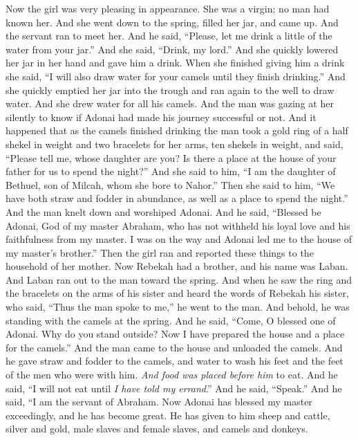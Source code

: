 \begin{biblechapter}
\verse Now the girl was very pleasing in appearance. She was a virgin; no man had known her. And she went down to the spring, filled her jar, and came up.
\verse And the servant ran to meet her. And he said, “Please, let me drink a little of the water from your jar.”
\verse And she said, “Drink, my lord.” And she quickly lowered her jar in her hand and gave him a drink.
\verse When she finished giving him a drink she said, “I will also draw water for your camels until they finish drinking.”
\verse And she quickly emptied her jar into the trough and ran again to the well to draw water. And she drew water for all his camels.
\verse And the man was gazing at her silently to know if Adonai had made his journey successful or not.
\verse And it happened that as the camels finished drinking the man took a gold ring of a half shekel in weight and two bracelets for her arms, ten shekels in weight,
\verse and said, “Please tell me, whose daughter are you? Is there a place at the house of your father for us to spend the night?”
\verse And she said to him, “I am the daughter of Bethuel, son of Milcah, whom she bore to Nahor.”
\verse Then she said to him, “We have both straw and fodder in abundance, as well as a place to spend the night.”
\verse And the man knelt down and worshiped Adonai.
\verse And he said, “Blessed be Adonai, God of my master Abraham, who has not withheld his loyal love and his faithfulness from my master. I was on the way and Adonai led me to the house of my master’s brother.”
\verse Then the girl ran and reported these things to the household of her mother.
\verse Now Rebekah had a brother, and his name was Laban. And Laban ran out to the man toward the spring.
\verse And when he saw the ring and the bracelets on the arms of his sister and heard the words of Rebekah his sister, who said, “Thus the man spoke to me,” he went to the man. And behold, he was standing with the camels at the spring.
\verse And he said, “Come, O blessed one of Adonai. Why do you stand outside? Now I have prepared the house and a place for the camels.”
\verse And the man came to the house and unloaded the camels. And he gave straw and fodder to the camels, and water to wash his feet and the feet of the men who were with him.
\verse \textit{And food was placed before him} to eat. And he said, “I will not eat until \textit{I have told my errand}.” And he said, “Speak.”
\verse And he said, “I am the servant of Abraham.
\verse Now Adonai has blessed my master exceedingly, and he has become great. He has given to him sheep and cattle, silver and gold, male slaves and female slaves, and camels and donkeys.

\end{biblechapter}
